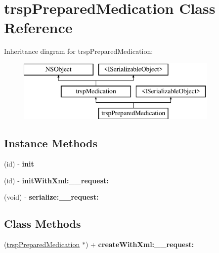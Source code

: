 \hypertarget{interfacetrsp_prepared_medication}{}\section{trsp\+Prepared\+Medication Class Reference}
\label{interfacetrsp_prepared_medication}
Inheritance diagram for trsp\+Prepared\+Medication\+:\begin{figure}[H]
\begin{center}
\leavevmode
\includegraphics[height=3.000000cm]{interfacetrsp_prepared_medication}
\end{center}
\end{figure}
\subsection*{Instance Methods}
\begin{DoxyCompactItemize}
\item 
\hypertarget{interfacetrsp_prepared_medication_ad79afc24cec2bd3d86724f5b109b9ccb}{}(id) -\/ {\bfseries init}\label{interfacetrsp_prepared_medication_ad79afc24cec2bd3d86724f5b109b9ccb}

\item 
\hypertarget{interfacetrsp_prepared_medication_aaf5879459b8c7d9041298a298d7fbfa6}{}(id) -\/ {\bfseries init\+With\+Xml\+:\+\_\+\+\_\+request\+:}\label{interfacetrsp_prepared_medication_aaf5879459b8c7d9041298a298d7fbfa6}

\item 
\hypertarget{interfacetrsp_prepared_medication_ae760035efbd23d393e23574321bc3ad1}{}(void) -\/ {\bfseries serialize\+:\+\_\+\+\_\+request\+:}\label{interfacetrsp_prepared_medication_ae760035efbd23d393e23574321bc3ad1}

\end{DoxyCompactItemize}
\subsection*{Class Methods}
\begin{DoxyCompactItemize}
\item 
\hypertarget{interfacetrsp_prepared_medication_a45ad97733a32aae4e79fa178a4ef0594}{}(\hyperlink{interfacetrsp_prepared_medication}{trsp\+Prepared\+Medication} $\ast$) + {\bfseries create\+With\+Xml\+:\+\_\+\+\_\+request\+:}\label{interfacetrsp_prepared_medication_a45ad97733a32aae4e79fa178a4ef0594}

\end{DoxyCompactItemize}
